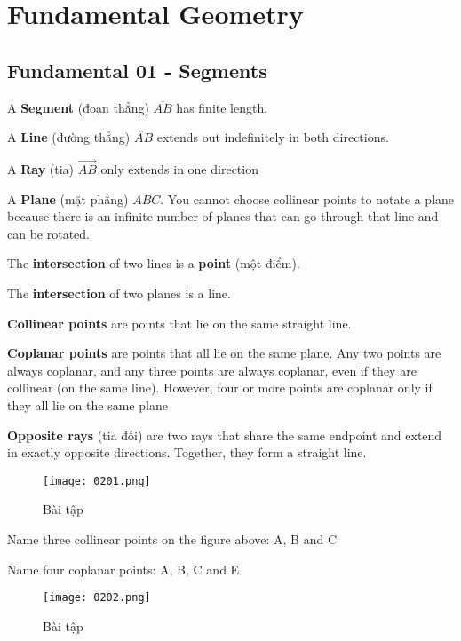 \chapter{Fundamental Geometry}

\section{Fundamental 01 - Segments}

A \textbf{Segment} (đoạn thẳng) $\overline{AB}$ has finite length.

A \textbf{Line} (đường thẳng) $\overleftrightarrow{AB}$ extends out indefinitely in both directions.

A \textbf{Ray} (tia) $\overrightarrow{AB}$ only extends in one direction

A \textbf{Plane} (mặt phẳng) $ABC$. You cannot choose collinear points to notate a plane because there is an infinite number of planes that can go through that line and can be rotated.

The \textbf{intersection} of two lines is a \textbf{point} (một điểm).

The \textbf{intersection} of two planes is a line.

\textbf{Collinear points} are points that lie on the same straight line.

\textbf{Coplanar points} are points that all lie on the same plane. Any two points are always coplanar, and any three points are always coplanar, even if they are collinear (on the same line). However, four or more points are coplanar only if they all lie on the same plane

\textbf{Opposite rays} (tia đối) are two rays that share the same endpoint and extend in exactly opposite directions. Together, they form a straight line.

\begin{figure}[ht]
  \centering
  \texttt{[image: 0201.png]}
  \caption{Bài tập}
\end{figure}

Name three collinear points on the figure above: A, B and C

Name four coplanar points: A, B, C and E

\vspace{10 mm}

\begin{figure}[ht]
  \centering
  \texttt{[image: 0202.png]}
  \caption{Bài tập}
\end{figure}

